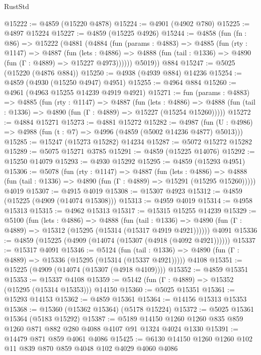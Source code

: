 \begin{lexlean}{RustStd}
\begin{coremodule}
@15222 := @4859 (@15220 @4878)
@15224 := @4901 (@4902 @780)
@15225 := @4897 @15224
@15227 := @4859 (@15225 @4926)
@15244 := @4858
    (fun (fn : @86) =>
    @15222
      (@4881
        (@4884
          (fun (params : @4883) =>
          @4885
            (fun (rty : @1147) =>
            @4887
              (fun (lets : @4886) =>
              @4888 (fun (tail : @1336) => @4890 (fun (Γ : @4889) => @15227 @4973))))))
        @5019))
    @884
@15247 := @5025 (@15220 (@4876 @884))
@15250 := @4938 (@4939 @884) @14236
@15254 := @4859 (@4930 (@15250 @4947) @4951)
@15255 := @4964 @884
@15260 := @4961 (@4963 @15255 @14239 @4919 @4921)
@15271 := fun (params : @4883) =>
  @4885
    (fun (rty : @1147) =>
    @4887
      (fun (lets : @4886) =>
      @4888 (fun (tail : @1336) => @4890 (fun (Γ : @4889) => @15227 (@15254 @15260)))))
@15272 := @4884 @15271
@15273 := @4881 @15272
@15282 := @4987
    (fun (U : @4986) => @4988 (fun (t : @7) => @4996 (@4859 (@5002 @14236 @4877) @5013)))
@15285 := @15247 (@15273 @15282) @14234
@15287 := @5072 @15272 @15282
@15289 := @5075 @15271 @3785
@15291 := @4859 (@15225 @14076)
@15292 := @15250 @14079
@15293 := @4930 @15292
@15295 := @4859 (@15293 @4951)
@15306 := @5078
    (fun (rty : @1147) =>
    @4887
      (fun (lets : @4886) =>
      @4888 (fun (tail : @1336) => @4890 (fun (Γ : @4889) => @15291 (@15295 @15260)))))
    @4019
@15307 := @4915 @4019
@15308 := @15307 @4923
@15312 := @4859 (@15225 (@4909 (@14074 @15308)))
@15313 := @4959 @4019
@15314 := @4958 @15313
@15315 := @4962 @15313
@15317 := @15315 @15255 @14239
@15329 := @5100
    (fun (lets : @4886) =>
    @4888
      (fun (tail : @1336) =>
      @4890 (fun (Γ : @4889) => @15312 (@15295 (@15314 (@15317 @4919 @4921))))))
    @4091
@15336 := @4859 (@15225 (@4909 (@14074 (@15307 (@4918 (@4092 @4921))))))
@15337 := @15317 @4091
@15346 := @5124
    (fun (tail : @1336) => @4890 (fun (Γ : @4889) => @15336 (@15295 (@15314 (@15337 @4921)))))
    @4108
@15351 := @15225 (@4909 (@14074 (@15307 (@4918 @4109))))
@15352 := @4859 @15351
@15353 := @15337 @4108
@15359 := @5142 (fun (Γ : @4889) => @15352 (@15295 (@15314 @15353))) @14150
@15360 := @5025 @15351
@15361 := @15293 @14153
@15362 := @4859 @15361
@15364 := @14156 @15313 @15353
@15368 := @15360 (@15362 @15364) (@5178 @15224)
@15372 := @5025 @15361 @15364 (@5183 @15292)
@15387 := @5189 @14150 @1260 @1260 @835 @859 @1260 @871 @882 @280 @4088 @4107 @91 @1324 @4024 @1330
@15391 := @14479 @871 @859 @4061 @4086
@15425 := @6130
    @14150
    @1260
    @1260
    @102
    @11
    @839
    @870
    @859
    @4048
    @102
    @4029
    @4060
    @4086

\end{coremodule}
\end{lexlean}
